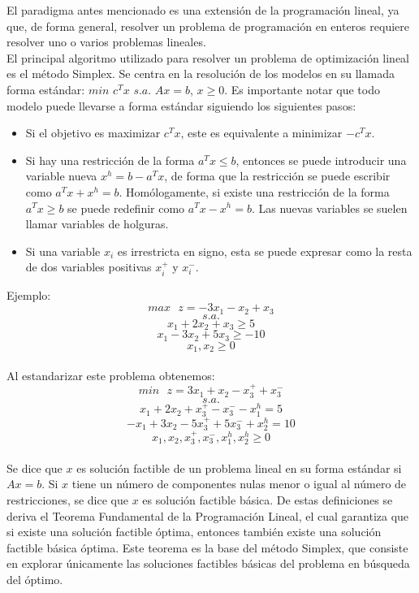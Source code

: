 \documentclass[runningheads]{llncs}
\begin{document}
El paradigma antes mencionado es una extensión de la programación lineal, ya que, de forma general, resolver un problema de programación en enteros requiere resolver uno o varios problemas lineales.\\

El principal algoritmo utilizado para resolver un problema de optimización lineal es el método Simplex. Se centra en la resolución de los modelos en su llamada forma estándar: $min$ $c^Tx$ $s.a.$ $Ax=b$, $x\geq 0$. Es importante notar que todo modelo puede llevarse a forma estándar siguiendo los siguientes pasos:
\begin{itemize}
    \item Si el objetivo es maximizar $c^Tx$, este es equivalente a minimizar $-c^Tx$.
    \item Si hay una restricción de la forma $a^Tx\leq b$, entonces se puede introducir una variable nueva $x^h=b-a^Tx$, de forma que la restricción se puede escribir como $a^Tx+x^h=b$. Homólogamente, si existe una restricción de la forma $a^Tx\geq b$ se puede redefinir como $a^Tx-x^h=b$. Las nuevas variables se suelen llamar variables de holguras.
    \item Si una variable $x_i$ es irrestricta en signo, esta se puede expresar como la resta de dos variables positivas $x_i^+$ y $x_i^-$.\\
\end{itemize}

Ejemplo:
$$max \text{ }z= -3x_1-x_2+x_3$$
$$s.a.$$
$$x_1+2x_2+x_3\geq 5$$
$$x_1-3x_2+5x_3\geq -10$$
$$x_1,x_2\geq 0$$\\

Al estandarizar este problema obtenemos:
$$min \text{ }z= 3x_1+x_2-x_3^++x_3^-$$
$$s.a.$$
$$x_1+2x_2+x_3^+-x_3^--x_1^h=5$$
$$-x_1+3x_2-5x_3^++5x_3^-+x_2^h=10$$
$$x_1,x_2,x_3^+,x_3^-,x_1^h,x_2^h\geq 0$$\\

Se dice que $x$ es solución factible de un problema lineal en su forma estándar si $Ax=b$. Si $x$ tiene un número de componentes nulas menor o igual al número de restricciones, se dice que $x$ es solución factible básica. De estas definiciones se deriva el Teorema Fundamental de la Programación Lineal, el cual garantiza que si existe una solución factible óptima, entonces también existe una solución factible básica óptima. Este teorema es la base del método Simplex, que consiste en explorar únicamente las soluciones factibles básicas del problema en búsqueda del óptimo.\\
\end{document}

